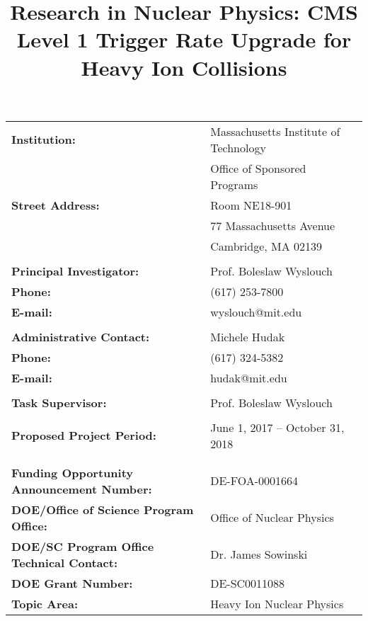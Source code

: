 \begin{titlepage}
\vspace{2.2 cm}
\title{Research in Nuclear Physics:
CMS Level 1 Trigger Rate Upgrade for Heavy Ion Collisions}

\vspace{.2 cm} 

\begin{center}
\begin{tabular}{ll}
 
\textbf{Institution:}                & Massachusetts Institute of Technology \\
                                     & Office of Sponsored Programs\\
\textbf{Street Address:} &	Room NE18-901 \\
				& 77 Massachusetts Avenue \\
				&	Cambridge, MA 02139 \\
& \\
\textbf{Principal Investigator:} & 	Prof. Boleslaw Wyslouch \\
\textbf{Phone:} & 			(617) 253-7800 \\
\textbf{E-mail:} & 			wyslouch@mit.edu \\
& \\
\textbf{Administrative Contact:} &	Michele Hudak \\
\textbf{Phone:} & 			(617) 324-5382 \\
\textbf{E-mail:} & 			hudak@mit.edu \\
& \\
\textbf{Task Supervisor:} &		Prof. Boleslaw Wyslouch \\
& \\
\textbf{Proposed Project Period:} &	June 1, 2017 – October 31, 2018 \\
&\\
& \\
\textbf{Funding Opportunity Announcement Number:} & 	DE-FOA-0001664 \\
\textbf{DOE/Office of Science Program Office:} & 		Office of Nuclear Physics \\ 
\textbf{DOE/SC Program Office Technical Contact:} & 	Dr. James Sowinski \\
\textbf{DOE Grant Number:} &				DE-SC0011088 \\
\textbf{Topic Area:	} &					Heavy Ion Nuclear Physics \\

\end{tabular}
\end{center}



\end{titlepage}






